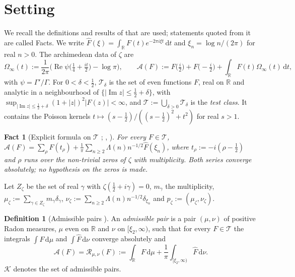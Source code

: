 \documentclass[11pt]{amsart}
\newcommand{\RR}{\mathbb R}
\newcommand{\dd}{\,\mathrm d}
\renewcommand{\Re}{\operatorname{Re}}
\renewcommand{\Im}{\operatorname{Im}}
\newcommand{\hF}{\widehat F}
\newcommand{\xin}[1]{\xi_{#1}}
\newcommand{\Zz}{Z_\zeta}
\newcommand{\muz}{\mu_\zeta}
\newcommand{\nuz}{\nu_\zeta}
\newcommand{\pz}{p_\zeta}
\newcommand{\Oinf}{\Omega_\infty}
\newcommand{\Arch}{\mathcal A}
\newcommand{\Tc}{\mathcal T}
\newcommand{\Spec}{\mathcal R}
\newcommand{\Kad}{\mathcal K}
\newtheorem{fact}[theorem]{Fact}
\theoremstyle{definition}
\newtheorem{definition}[theorem]{Definition}
\theoremstyle{remark}
\numberwithin{equation}{section}
\begin{document}
\section{Setting}\label{sec:setting}

We recall the definitions and results of \cite{PaperI} that are used; statements quoted from it are called Facts. We write
$\hF(\xi)=\int_\RR F(t)e^{-2\pi i\xi t}\dd t$ and $\xin n=\log n/(2\pi)$ for real $n>0$. The archimedean data of $\zeta$ are
\[
\Oinf(t):=\frac1{2\pi}\Big(\Re\psi\big(\tfrac14+\tfrac{it}2\big)-\log\pi\Big),\qquad
\Arch(F):=F\big(\tfrac i2\big)+F\big(-\tfrac i2\big)+\int_\RR F(t)\Oinf(t)\dd t,
\]
with $\psi=\Gamma'/\Gamma$. For $0<\delta<\frac12$, $\Tc_\delta$ is the set of even functions $F$, real on $\RR$ and analytic in a
neighbourhood of $\{\lvert\Im z\rvert\le\frac12+\delta\}$, with $\sup_{\lvert\Im z\rvert\le\frac12+\delta}(1+\lvert z\rvert)^2\lvert F(z)\rvert<\infty$, and
$\Tc:=\bigcup_{\delta>0}\Tc_\delta$ is the \emph{test class}. It contains the Poisson kernels $t\mapsto(s-\frac12)/((s-\frac12)^2+t^2)$
for real $s>1$.

\begin{fact}[Explicit formula on $\Tc$ {\cite{PaperI}}; {\cite{Wei52}}, {\cite[(1.1)]{BRS}}]\label{lem:explicit-formula}
For every $F\in\Tc$, $\Arch(F)=\sum_\rho F(t_\rho)+\frac1\pi\sum_{n\ge2}\Lambda(n)n^{-1/2}\hF(\xin n)$, where $t_\rho:=-i(\rho-\frac12)$ and
$\rho$ runs over the non-trivial zeros of $\zeta$ with multiplicity. Both series converge absolutely; no hypothesis on the
zeros is made.
\end{fact}

Let $\Zz$ be the set of real $\gamma$ with $\zeta(\frac12+i\gamma)=0$, $m_\gamma$ the multiplicity,
$\muz:=\sum_{\gamma\in\Zz}m_\gamma\delta_\gamma$, $\nuz:=\sum_{n\ge2}\Lambda(n)n^{-1/2}\delta_{\xin n}$ and $\pz:=(\muz,\nuz)$.

\begin{definition}[Admissible pairs {\cite{PaperI}}]\label{def:admissible}
An \emph{admissible pair} is a pair $(\mu,\nu)$ of positive Radon measures, $\mu$ even on $\RR$ and $\nu$ on $[\xin2,\infty)$, such
that for every $F\in\Tc$ the integrals $\int F\dd\mu$ and $\int\hF\dd\nu$ converge absolutely and
\[
\Arch(F)=\Spec_{\mu,\nu}(F):=\int_\RR F\dd\mu+\frac1\pi\int_{[\xin2,\infty)}\hF\dd\nu .
\]
$\Kad$ denotes the set of admissible pairs.
\end{definition}
\end{document}

